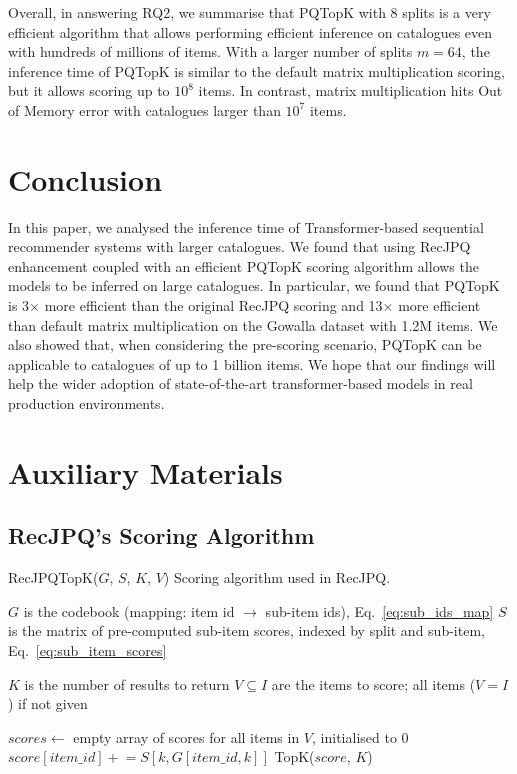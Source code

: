 \documentclass[sigconf,natbib=true, review=true]{acmart} %
\newcommand{\rsasha}[1]{\textcolor[HTML]{FF0000}{#1}}
\newcommand{\pluseq}{\mathrel{+}=}
\begin{document}
Overall, in answering RQ2, we summarise that PQTopK with 8 splits is a very efficient algorithm that allows performing efficient inference on catalogues even with hundreds of millions of items. With a larger number of splits $m=64$, the inference time of PQTopK is similar to the default matrix multiplication scoring, but it allows scoring up to $10^8$ items. In contrast, matrix multiplication hits Out of Memory error with catalogues larger than  $10^7$ items. 




\section{Conclusion}\label{sec:conclusion}
 In this paper, we analysed the inference time of Transformer-based sequential recommender systems with larger catalogues.  We found that using RecJPQ enhancement coupled with an efficient PQTopK scoring algorithm allows the models to be inferred on large catalogues. In particular, we found that PQTopK is 3$\times$ more efficient than the original RecJPQ scoring and 13$\times$ more efficient than default matrix multiplication \rsasha{on the Gowalla dataset with 1.2M items}. We also showed that, when considering the pre-scoring scenario, PQTopK can be applicable to catalogues of up to 1 billion items. We hope that our findings will help the wider adoption of state-of-the-art transformer-based models in real production environments. 






\balance

\clearpage
\appendix
\section{Auxiliary Materials}
\subsection{RecJPQ's Scoring Algorithm}
\begin{algorithm}[h]
\small
\caption{RecJPQTopK($G$, $S$, $K$, $V$) Scoring algorithm used in RecJPQ.}\label{alg:RecJPQtop_k}
\begin{algorithmic}[1]
   \Require $G$ is the codebook (mapping: item id $\rightarrow$ sub-item ids), Eq.~\eqref{eq:sub_ids_map}
   \Require $S$ is the matrix of pre-computed sub-item scores, indexed by split and sub-item, Eq.~\eqref{eq:sub_item_scores}

    

   \Require $K$ is the number of results to return
   \Require $V \subseteq I$ are the items to score; all items ($V = I$)  if not given 
   
   \State $scores \gets$ empty array of scores for all items in $V$, initialised to 0
    
            \State $score[item\_id]  \pluseq S[k,G[item\_id,k]] $ 
        \EndFor
   \EndFor
   \State \Return TopK($score$, $K$) 
\end{algorithmic}
\end{algorithm}
\end{document}
